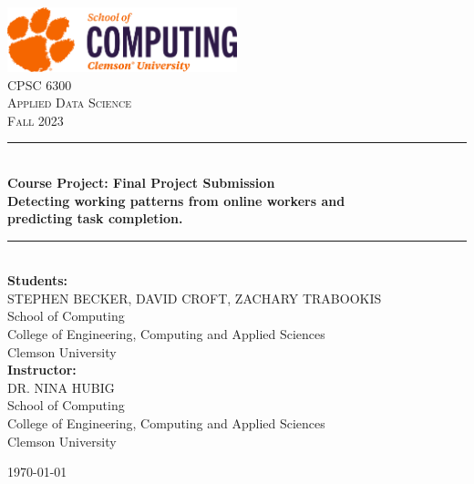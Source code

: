 \documentclass[11pt]{article}
\newcommand{\HRule}{\rule{\linewidth}{0.5mm}}
\begin{document}
 
%

\begin{titlepage}
  \begin{center}
    \includegraphics[width=0.5\textwidth]{figures/SoC-CU-Orange-and-Purple.png}~\\[2cm]

    \textsc{\Large CPSC 6300 \\ Applied Data Science \\ Fall 2023}\\[1cm]


    \HRule \\[0.4cm]
    {\large \bfseries Course Project: Final Project Submission\\ Detecting working patterns from online workers and \\ predicting task completion. \\[0.4cm]}
    \HRule \\[2cm]
    
    \large\textbf{Students:}\\
    STEPHEN BECKER, DAVID CROFT, ZACHARY TRABOOKIS \\ School of Computing \\ College of Engineering, Computing and Applied Sciences \\ 
    Clemson University\\[1cm]

    \large\textbf{Instructor:}\\
    DR. NINA HUBIG  \\ School of Computing \\ College of Engineering, Computing and Applied Sciences \\ 
    Clemson University\\[1cm]

    \vfill

    {\large \today}

  \end{center}
\end{titlepage}

\rhead{\today}
 
\end{document}
